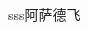 \documentclass[10pt,a4paper,draft,UTF8]{ctexart}
\begin{document}
\begin{CJK}{UTF8}{gbsn}

sss阿萨德飞
\end{CJK}
\end{document}
